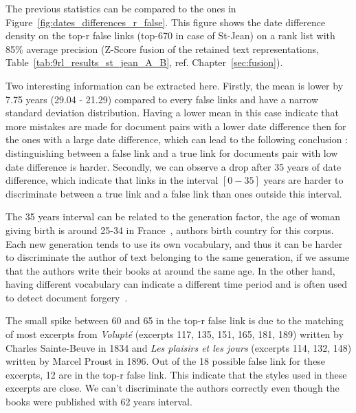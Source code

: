 The previous statistics can be compared to the ones in Figure~\ref{fig:dates_differences_r_false}.
This figure shows the date difference density on the top-r false links (top-670 in case of St-Jean) on a rank list with 85\% average precision (Z-Score fusion of the retained text representations, Table~\ref{tab:9rl_results_st_jean_A_B}, ref. Chapter~\ref{sec:fusion}).

Two interesting information can be extracted here.
Firstly, the mean is lower by 7.75 years (29.04 - 21.29) compared to every false links and have a narrow standard deviation distribution.
Having a lower mean in this case indicate that more mistakes are made for document pairs with a lower date difference then for the ones with a large date difference, which can lead to the following conclusion : distinguishing between a false link and a true link for documents pair with low date difference is harder.
Secondly, we can observe a drop after 35 years of date difference, which indicate that links in the interval $\left[0-35\right]$ years are harder to discriminate between a true link and a false link than ones outside this interval.

The 35 years interval can be related to the generation factor, the age of woman giving birth is around 25-34 in France~\cite{generations}, authors birth country for this corpus.
Each new generation tends to use its own vocabulary, and thus it can be harder to discriminate the author of text belonging to the same generation, if we assume that the authors write their books at around the same age.
In the other hand, having different vocabulary can indicate a different time period and is often used to detect document forgery~\cite{savoy_stylo}.

The small spike between 60 and 65 in the top-r false link is due to the matching of most excerpts from \textit{Volupté} (excerpts 117, 135, 151, 165, 181, 189) written by Charles Sainte-Beuve in 1834 and \textit{Les plaisirs et les jours} (excerpts 114, 132, 148) written by Marcel Proust in 1896.
Out of the 18 possible false link for these excerpts, 12 are in the top-r false link.
This indicate that the styles used in these excerpts are close.
We can't discriminate the authors correctly even though the books were published with 62 years interval.

